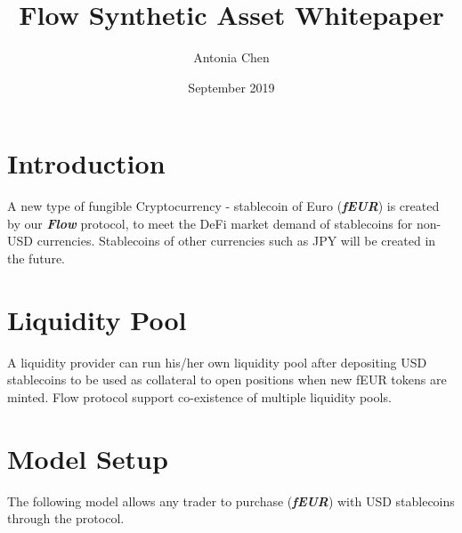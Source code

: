 \documentclass{article}
\title{Flow Synthetic Asset Whitepaper}
\author{Antonia Chen}
\date{September 2019}
\begin{document}
\maketitle

\section{Introduction}
A new type of fungible Cryptocurrency - stablecoin of Euro  (\textbf{\textit{fEUR}}) is created by our \textbf{\textit{Flow}} protocol, to meet the DeFi market demand of stablecoins for non-USD currencies. Stablecoins of other currencies such as JPY will be created in the future.  

\section{Liquidity Pool}
A liquidity provider can run his/her own liquidity pool after depositing USD stablecoins to be used as collateral to open positions when new fEUR tokens are minted. Flow protocol support co-existence of multiple liquidity pools. 

\section{Model Setup}
The following model allows any trader to purchase  (\textbf{\textit{fEUR}}) with USD stablecoins through the protocol. 
\end{document}
